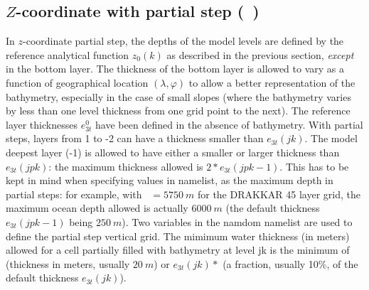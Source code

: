 \documentclass[../main/NEMO_manual]{subfiles}
\begin{document}
\subsection{$Z$-coordinate with partial step (\protect{}~)}
\label{subsec:DOM_zps}


In $z$-coordinate partial step,
the depths of the model levels are defined by the reference analytical function $z_0(k)$ as described in
the previous section, \textit{except} in the bottom layer.
The thickness of the bottom layer is allowed to vary as a function of geographical location $(\lambda,\varphi)$ to
allow a better representation of the bathymetry, especially in the case of small slopes
(where the bathymetry varies by less than one level thickness from one grid point to the next).
The reference layer thicknesses $e_{3t}^0$ have been defined in the absence of bathymetry.
With partial steps, layers from 1 to -2 can have a thickness smaller than $e_{3t}(jk)$.
The model deepest layer (-1) is allowed to have either a smaller or larger thickness than $e_{3t}(jpk)$:
the maximum thickness allowed is $2*e_{3t}(jpk - 1)$.
This has to be kept in mind when specifying values in  namelist,
as the maximum depth  in partial steps:
for example, with ~$= 5750~m$ for the DRAKKAR 45 layer grid,
the maximum ocean depth allowed is actually $6000~m$ (the default thickness $e_{3t}(jpk - 1)$ being $250~m$).
Two variables in the namdom namelist are used to define the partial step vertical grid.
The mimimum water thickness (in meters) allowed for a cell partially filled with bathymetry at level jk is
the minimum of  (thickness in meters, usually $20~m$) or $e_{3t}(jk)*$
(a fraction, usually 10\%, of the default thickness $e_{3t}(jk)$).


\end{document}
